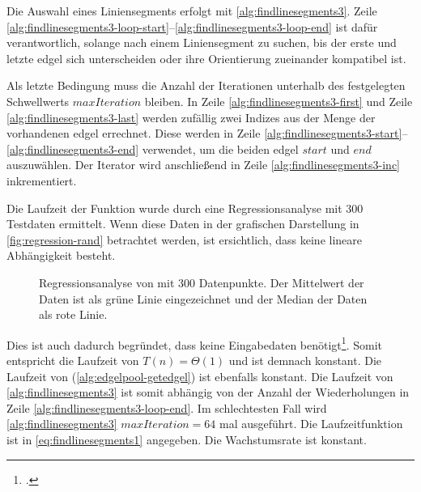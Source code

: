 Die Auswahl eines Liniensegments erfolgt mit \autoref{alg:findlinesegments3}. Zeile
 \ref{alg:findlinesegments3-loop-start}--\ref{alg:findlinesegments3-loop-end} ist dafür verantwortlich, solange nach
 einem Liniensegment zu suchen, bis der erste und letzte \gls{edgel} sich unterscheiden oder ihre Orientierung
 zueinander kompatibel ist.

Als letzte Bedingung muss die Anzahl der Iterationen unterhalb des festgelegten Schwellwerts $\mathit{maxIteration}$
 bleiben. In Zeile \ref{alg:findlinesegments3-first} und Zeile \ref{alg:findlinesegments3-last} werden zufällig zwei
 Indizes aus der Menge der vorhandenen \gls{edgel} errechnet. Diese werden in Zeile
 \ref{alg:findlinesegments3-start}--\ref{alg:findlinesegments3-end} verwendet, um die beiden \gls{edgel}
 $\mathit{start}$ und $\mathit{end}$ auszuwählen. Der Iterator wird anschließend in Zeile
 \ref{alg:findlinesegments3-inc} inkrementiert.

Die Laufzeit der Funktion  wurde durch eine Regressionsanalyse mit $300$ Testdaten ermittelt. Wenn diese
 Daten in der grafischen Darstellung in \autoref{fig:regression-rand} betrachtet werden, ist ersichtlich, dass keine
 lineare Abhängigkeit besteht.
\begin{figure}[!ht]
	\centering
	
	\caption{Regressionsanalyse von  mit $300$ Datenpunkte. Der Mittelwert der Daten ist als grüne Linie
	 eingezeichnet und der Median der Daten als rote Linie.}
	\label{fig:regression-rand}
\end{figure}
Dies ist auch dadurch begründet, dass  keine Eingabedaten benötigt\footcite[Vgl.][]{rand}. Somit
 entspricht die Laufzeit von  $T(n) = \Theta(1)$ und ist demnach konstant. Die Laufzeit von
  (\autoref{alg:edgelpool-getedgel}) ist ebenfalls konstant. Die Laufzeit von
 \autoref{alg:findlinesegments3} ist somit abhängig von der Anzahl der Wiederholungen in Zeile
 \ref{alg:findlinesegments3-loop-end}. Im schlechtesten Fall wird \autoref{alg:findlinesegments3}
 $\mathit{maxIteration} = 64$ mal ausgeführt. Die Laufzeitfunktion ist in \autoref{eq:findlinesegments1} angegeben. Die
 Wachstumsrate ist konstant.


